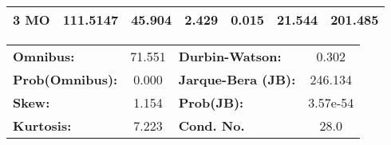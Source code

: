 \begin{center}
\begin{tabular}{lcccccc}
\textbf{3 MO}    &     111.5147  &       45.904     &     2.429  &         0.015        &       21.544    &      201.485     \\
\bottomrule
\end{tabular}
\begin{tabular}{lclc}
\textbf{Omnibus:}       & 71.551 & \textbf{  Durbin-Watson:     } &    0.302  \\
\textbf{Prob(Omnibus):} &  0.000 & \textbf{  Jarque-Bera (JB):  } &  246.134  \\
\textbf{Skew:}          &  1.154 & \textbf{  Prob(JB):          } & 3.57e-54  \\
\textbf{Kurtosis:}      &  7.223 & \textbf{  Cond. No.          } &     28.0  \\
\bottomrule
\end{tabular}
\end{center}

